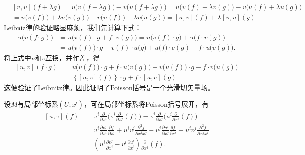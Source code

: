 \begin{align*}
    &\left[u,v\right] (f + \lambda g) = u\bigl(v(f + \lambda g)\bigr) - v\bigl(u(f + \lambda g)\bigr) 
    =u\bigl(v(f)+\lambda v(g)\bigr)- v\bigl(u(f)+\lambda u(g)\bigr) \\
    &=u\bigl(v(f)\bigr)+ \lambda u\bigl(v(g)\bigr) - v\bigl(u(f)\bigr) - \lambda v\bigl( u(g)\bigr) 
    =\left[u,v\right] (f ) + \lambda \left[u,v\right] ( g) .
\end{align*}
Leibniz律的验证略显麻烦，我们先计算下式：
\begin{align*}
    u\bigl(v(f \cdot g)\bigr) &= u\bigl( v(f) \cdot g+ f \cdot v( g)\bigr)    
      = u\bigl( v(f) \cdot g\bigr) + u\bigl( f \cdot v( g)\bigr) \\
      &= u\bigl( v(f) \bigr) \cdot g + v(f) \cdot u\bigl(  g\bigr) 
      + u\bigl( f \bigr) \cdot v(g) + f \cdot u\bigl( v( g)\bigr) .
\end{align*}
将上式中$u$和$v$互换，并作差，得
\begin{align*}
    \left[u,v\right] (f \cdot g) &= u\bigl( v(f) \bigr) \cdot g + f \cdot u\bigl( v( g)\bigr)
      -v\bigl( u(f) \bigr) \cdot g - f \cdot v\bigl( u( g)\bigr) \\
      & =\left\{ \left[u,v\right](f) \right\} \cdot g + f \cdot \left[u,v\right]  (g)
\end{align*}
这便验证了Leibnitz律。因此证明了Poisson括号是一个光滑切矢量场。

设$M$有局部坐标系$(U;x^i)$，可在局部坐标系将Poisson括号展开，有
\begin{equation}\label{chdm:eqn_poisson-bracket-expand}
\begin{aligned}
    \left[u,v\right] (f) &= u^i\frac{\partial }{\partial x^i}\bigl(v^j\frac{\partial }{\partial x^j}(f)\bigr)
       - v^j\frac{\partial }{\partial x^j}\bigl(u^i\frac{\partial }{\partial x^i}(f)\bigr) \\
     &=  u^i\frac{\partial v^j}{\partial x^i} \frac{\partial f}{\partial x^j}
       + u^iv^j \frac{\partial^2 f}{\partial x^i x^j}
       - v^j\frac{\partial u^i}{\partial x^j}\frac{\partial f}{\partial x^i}
       - u^i v^j\frac{\partial^2 f}{\partial x^j x^i} \\
     &=  \left( u^i\frac{\partial v^j}{\partial x^i} 
       - v^i\frac{\partial u^j}{\partial x^i} \right)  \frac{\partial }{\partial x^j} (f) .
\end{aligned}
\end{equation}

